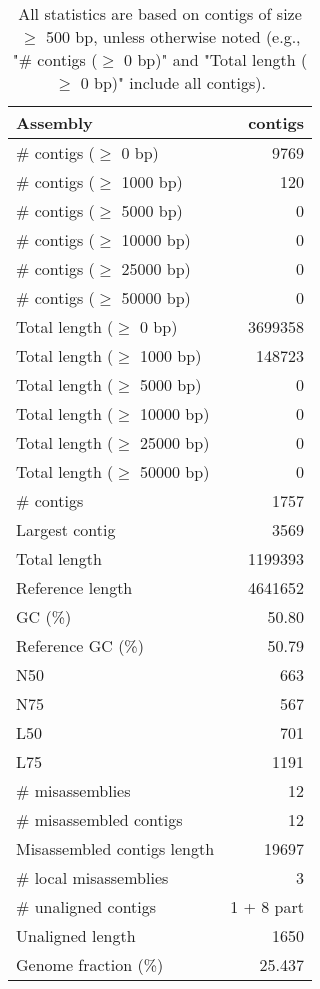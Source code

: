 \documentclass[12pt,a4paper]{article}
\begin{document}
\begin{table}[ht]
\begin{center}
\caption{All statistics are based on contigs of size $\geq$ 500 bp, unless otherwise noted (e.g., "\# contigs ($\geq$ 0 bp)" and "Total length ($\geq$ 0 bp)" include all contigs).}
\begin{tabular}{|l*{1}{|r}|}
\hline
Assembly & contigs \\ \hline
\# contigs ($\geq$ 0 bp) & 9769 \\ \hline
\# contigs ($\geq$ 1000 bp) & 120 \\ \hline
\# contigs ($\geq$ 5000 bp) & 0 \\ \hline
\# contigs ($\geq$ 10000 bp) & 0 \\ \hline
\# contigs ($\geq$ 25000 bp) & 0 \\ \hline
\# contigs ($\geq$ 50000 bp) & 0 \\ \hline
Total length ($\geq$ 0 bp) & 3699358 \\ \hline
Total length ($\geq$ 1000 bp) & 148723 \\ \hline
Total length ($\geq$ 5000 bp) & 0 \\ \hline
Total length ($\geq$ 10000 bp) & 0 \\ \hline
Total length ($\geq$ 25000 bp) & 0 \\ \hline
Total length ($\geq$ 50000 bp) & 0 \\ \hline
\# contigs & 1757 \\ \hline
Largest contig & 3569 \\ \hline
Total length & 1199393 \\ \hline
Reference length & 4641652 \\ \hline
GC (\%) & 50.80 \\ \hline
Reference GC (\%) & 50.79 \\ \hline
N50 & 663 \\ \hline
N75 & 567 \\ \hline
L50 & 701 \\ \hline
L75 & 1191 \\ \hline
\# misassemblies & 12 \\ \hline
\# misassembled contigs & 12 \\ \hline
Misassembled contigs length & 19697 \\ \hline
\# local misassemblies & 3 \\ \hline
\# unaligned contigs & 1 + 8 part \\ \hline
Unaligned length & 1650 \\ \hline
Genome fraction (\%) & 25.437 \\ \hline

\end{tabular}
\end{center}
\end{table}
\end{document}

